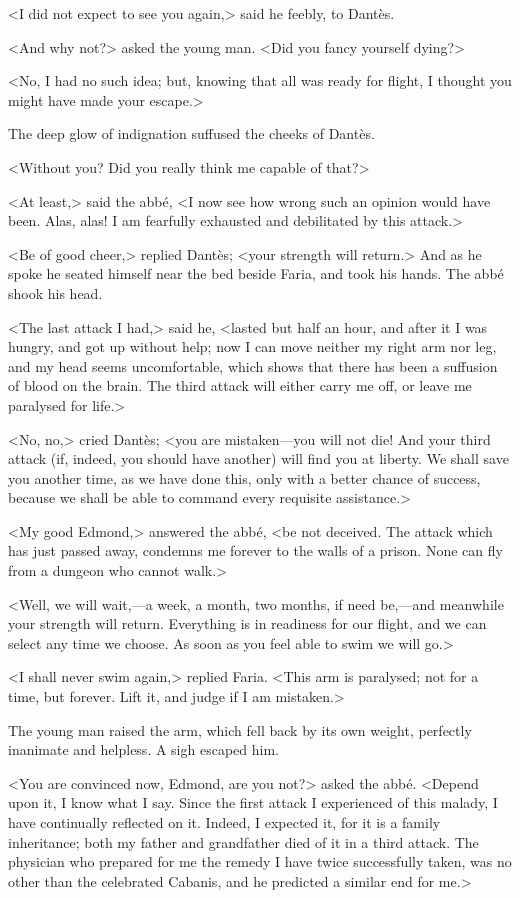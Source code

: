  <I did not expect to see you again,> said he feebly, to Dantès. 

 <And why not?> asked the young man. <Did you fancy yourself dying?> 

 <No, I had no such idea; but, knowing that all was ready for flight, I thought you might have made your escape.> 

 The deep glow of indignation suffused the cheeks of Dantès. 

 <Without you? Did you really think me capable of that?> 

 <At least,> said the abbé, <I now see how wrong such an opinion would have been. Alas, alas! I am fearfully exhausted and debilitated by this attack.> 

 <Be of good cheer,> replied Dantès; <your strength will return.> And as he spoke he seated himself near the bed beside Faria, and took his hands. The abbé shook his head. 

 <The last attack I had,> said he, <lasted but half an hour, and after it I was hungry, and got up without help; now I can move neither my right arm nor leg, and my head seems uncomfortable, which shows that there has been a suffusion of blood on the brain. The third attack will either carry me off, or leave me paralysed for life.> 

 <No, no,> cried Dantès; <you are mistaken—you will not die! And your third attack (if, indeed, you should have another) will find you at liberty. We shall save you another time, as we have done this, only with a better chance of success, because we shall be able to command every requisite assistance.> 

 <My good Edmond,> answered the abbé, <be not deceived. The attack which has just passed away, condemns me forever to the walls of a prison. None can fly from a dungeon who cannot walk.> 

 <Well, we will wait,—a week, a month, two months, if need be,—and meanwhile your strength will return. Everything is in readiness for our flight, and we can select any time we choose. As soon as you feel able to swim we will go.> 

 <I shall never swim again,> replied Faria. <This arm is paralysed; not for a time, but forever. Lift it, and judge if I am mistaken.> 

 The young man raised the arm, which fell back by its own weight, perfectly inanimate and helpless. A sigh escaped him. 

 <You are convinced now, Edmond, are you not?> asked the abbé. <Depend upon it, I know what I say. Since the first attack I experienced of this malady, I have continually reflected on it. Indeed, I expected it, for it is a family inheritance; both my father and grandfather died of it in a third attack. The physician who prepared for me the remedy I have twice successfully taken, was no other than the celebrated Cabanis, and he predicted a similar end for me.>


